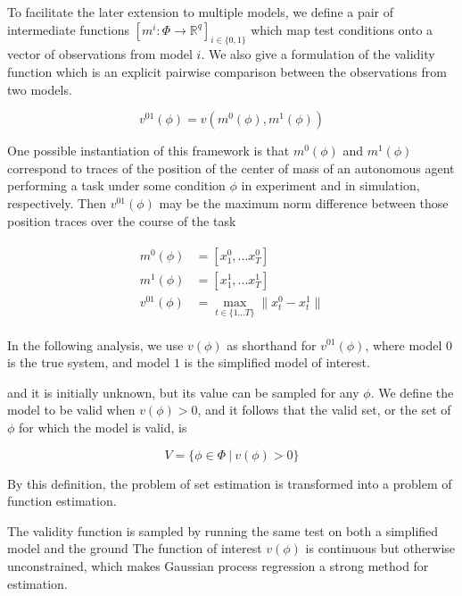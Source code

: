 \documentclass[letterpaper, 10 pt, conference]{ieeeconf}  %
\begin{document}
To facilitate the later extension to multiple models, we define a pair of intermediate functions $[m^i:\Phi\rightarrow\mathbb{R}^q]_{i\in\{0,1\}}$ which map test conditions onto a vector of observations from model $i$. We also give a formulation of the validity function which is an explicit pairwise comparison between the observations from two models.

\begin{equation}
    v^{01}(\phi) = v(m^0(\phi), m^1(\phi))
    \label{eq:valorig}
\end{equation}
\smallskip

One possible instantiation of this framework is that $m^0(\phi)$ and $m^1(\phi)$ correspond to traces of the position of the center of mass of an autonomous agent performing a task under some condition $\phi$ in experiment and in simulation, respectively. Then $v^{01}(\phi)$ may be the maximum norm difference between those position traces over the course of the task

\begin{align}
\begin{split}
    m^0(\phi)&=[x^0_1,...x^0_T] \\
    m^1(\phi)&=[x^1_1,...x^1_T] \\
    v^{01}(\phi) &= \max\limits_{t\in\{1...T\}} \|x^0_t-x^1_t\|
\end{split}
\end{align}
\smallskip

In the following analysis, we use $v(\phi)$ as shorthand for $v^{01}(\phi)$, where model $0$ is the true system, and model $1$ is the simplified model of interest.

and it is initially unknown, but its value can be sampled for any $\phi$. We define the model to be valid when $v(\phi)>0$, and it follows that the valid set, or the set of $\phi$ for which the model is valid, is

\begin{equation}
    V=\{\phi\in\Phi\ |\ v(\phi)>0\}
\end{equation}

By this definition, the problem of set estimation is transformed into a problem of function estimation.

The validity function is sampled by running the same test on both a simplified model and the ground The function of interest $v(\phi)$ is continuous but otherwise unconstrained, which makes Gaussian process regression a strong method for estimation. 
\linebreak
\end{document}
